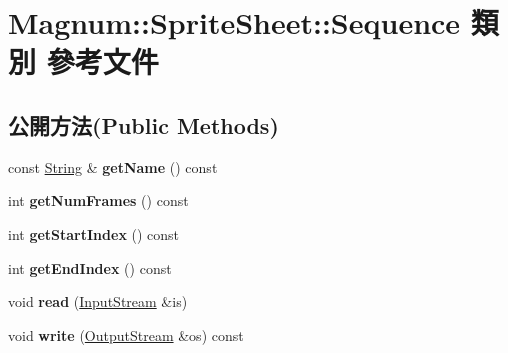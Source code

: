 \hypertarget{class_magnum_1_1_sprite_sheet_1_1_sequence}{}\section{Magnum\+:\+:Sprite\+Sheet\+:\+:Sequence 類別 參考文件}
\label{class_magnum_1_1_sprite_sheet_1_1_sequence}
\subsection*{公開方法(Public Methods)}
\begin{DoxyCompactItemize}
\item 
const \hyperlink{class_magnum_1_1_string}{String} \& {\bfseries get\+Name} () const \hypertarget{class_magnum_1_1_sprite_sheet_1_1_sequence_a0f0fd0130cab6fed646fe9a0251b970f}{}\label{class_magnum_1_1_sprite_sheet_1_1_sequence_a0f0fd0130cab6fed646fe9a0251b970f}

\item 
int {\bfseries get\+Num\+Frames} () const \hypertarget{class_magnum_1_1_sprite_sheet_1_1_sequence_a3f8b042fce691a2808e6c8da0f4a7f85}{}\label{class_magnum_1_1_sprite_sheet_1_1_sequence_a3f8b042fce691a2808e6c8da0f4a7f85}

\item 
int {\bfseries get\+Start\+Index} () const \hypertarget{class_magnum_1_1_sprite_sheet_1_1_sequence_a6b59c58c7138c8afc78ba189312239f7}{}\label{class_magnum_1_1_sprite_sheet_1_1_sequence_a6b59c58c7138c8afc78ba189312239f7}

\item 
int {\bfseries get\+End\+Index} () const \hypertarget{class_magnum_1_1_sprite_sheet_1_1_sequence_a7665f7fde1d9f09bd6964fd2019d765c}{}\label{class_magnum_1_1_sprite_sheet_1_1_sequence_a7665f7fde1d9f09bd6964fd2019d765c}

\item 
void {\bfseries read} (\hyperlink{class_magnum_1_1_input_stream}{Input\+Stream} \&is)\hypertarget{class_magnum_1_1_sprite_sheet_1_1_sequence_a723bdf6be58264df0ec31b847ca0fa53}{}\label{class_magnum_1_1_sprite_sheet_1_1_sequence_a723bdf6be58264df0ec31b847ca0fa53}

\item 
void {\bfseries write} (\hyperlink{class_magnum_1_1_output_stream}{Output\+Stream} \&os) const \hypertarget{class_magnum_1_1_sprite_sheet_1_1_sequence_a7dd557db59de25a42b8df759722ca2a6}{}\label{class_magnum_1_1_sprite_sheet_1_1_sequence_a7dd557db59de25a42b8df759722ca2a6}

\end{DoxyCompactItemize}
